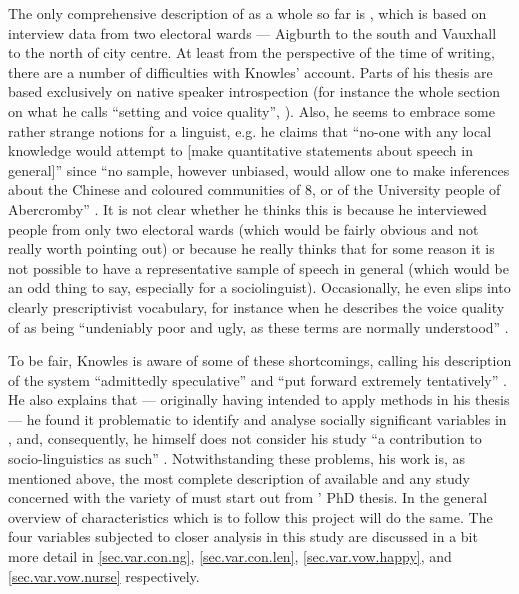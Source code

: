 The only comprehensive description of  as a whole so far is \citet{knowles1973}, which is based on interview data from two  electoral wards --- Aigburth to the south and Vauxhall to the north of  city centre.
At least from the perspective of the time of writing, there are a number of difficulties with Knowles' account.
Parts of his thesis are based exclusively on native speaker introspection (for instance the whole section on what he calls ``setting and voice quality'', \citealt[cf.][102]{knowles1973}).
Also, he seems to embrace some rather strange notions for a linguist, e.g. he claims that ``no-one with any local knowledge would attempt to [make quantitative statements about  speech in general]'' since ``no sample, however unbiased, would allow one to make inferences about the Chinese and coloured communities of  8, or of the University people of Abercromby'' \citep[3]{knowles1973}.
It is not clear whether he thinks this is because he interviewed people from only two electoral wards (which would be fairly obvious and not really worth pointing out) or because he really thinks that for some reason it is not possible to have a representative sample of  speech in general (which would be an odd thing to say, especially for a sociolinguist).
Occasionally, he even slips into clearly prescriptivist vocabulary, for instance when he describes the voice quality of  as being ``undeniably poor and ugly, as these terms are normally understood'' \citep[116]{knowles1973}.

To be fair, Knowles is aware of some of these shortcomings, calling his description of the   system ``admittedly speculative'' and ``put forward extremely tentatively'' \citep[111]{knowles1973}.
He also explains that --- originally having intended to apply  methods in his thesis --- he found it problematic to identify and analyse socially significant variables in , and, consequently, he himself does not consider his study ``a contribution to socio-linguistics as such'' \citep[cf.][1]{knowles1973}.
Notwithstanding these problems, his work is, as mentioned above, the most complete description of  available and any study concerned with the variety of  must start out from \citeauthor{knowles1973}' PhD thesis.
In the general overview of  characteristics which is to follow this project will do the same.
The four variables subjected to closer analysis in this study are discussed in a bit more detail in \ref{sec.var.con.ng}, \ref{sec.var.con.len}, \ref{sec.var.vow.happy}, and \ref{sec.var.vow.nurse} respectively.

